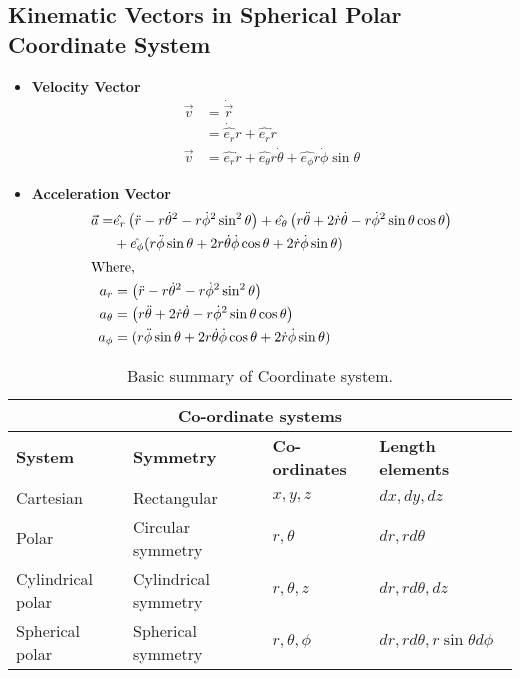 		\subsection{Kinematic Vectors in Spherical Polar Coordinate System}
		\begin{itemize}
			\item	\textbf{Velocity Vector}\begin{align*}
			\vec{v}&=\dot{\vec{r}}\\&=\dot{\hat{e_{r}}} r+\hat{e_{r}} \dot{r} \\
			\vec{v}&=\hat{e_{r}} \dot{r}+\hat{e_{\theta}} r \dot{\theta}+\hat{e_{\phi}} r \dot{\phi} \sin \theta
			\end{align*}
			\item \textbf{Acceleration Vector}
			\begin{align*}
			\vec{a}=&\hat{e_{r}}\left(\ddot{r}-r \dot{\theta}^{2}-r \dot{\phi}^{2} \sin ^{2} \theta\right)+\hat{e_{\theta}}\left(r \ddot{\theta}+2 \dot{r} \dot{\theta}-r \dot{\phi}^{2} \sin \theta \cos \theta\right)\\&+\hat{e_{\phi}}(r \ddot{\phi} \sin \theta+2 r \dot{\theta} \dot{\phi} \cos \theta+{2 \dot{r} \dot{\phi} \sin \theta})\\
			\intertext{Where,}
			a_{r}&=\left(\ddot{r}-r \dot{\theta}^{2}-r \dot{\phi}^{2} \sin ^{2} \theta\right)\\
			a_{\theta}&=\left(r \ddot{\theta}+2 \dot{r} \dot{\theta}-r \dot{\phi}^{2} \sin \theta \cos \theta\right)\\
			a_{\phi}&=(r \ddot{\phi} \sin \theta+2 r \dot{\theta} \dot{\phi} \cos \theta+2 \dot{r} \dot{\phi} \sin \theta)
			\end{align*} 
			
			\end {itemize}
			
			\begin{table}[H]
				\centering
				\renewcommand*{\arraystretch}{2}
				
				\begin{tabular}{|p{3cm}|p{3.5cm}|p{2.5cm}|p{3.5cm}|}
					\hline
					\multicolumn{4}{|c|}{\textbf{Co-ordinate systems}}\\\hline
					\textbf{System}&\textbf{Symmetry}&\textbf{Co-ordinates}
					&\textbf{Length elements}\\\hline
					Cartesian &Rectangular &$x,y,z$&$dx,dy,dz$\\\hline 
					Polar&Circular symmetry &$r ,\theta $&$dr ,r d\theta $ \\\hline
					Cylindrical polar&Cylindrical symmetry &$r ,\theta,z $&$dr ,r d\theta, dz $ \\\hline
					Spherical polar&Spherical symmetry &$r ,\theta ,\phi$&$dr ,r d\theta, r \sin \theta d\phi $\\\hline
					
				\end{tabular}
				\caption{Basic summary of Coordinate system.}
			\end{table}
			
